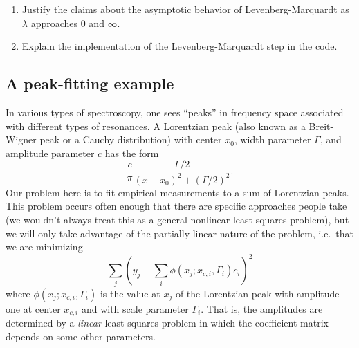 \documentclass[12pt, leqno]{article} %
\providecommand{\tightlist}{%
  \setlength{\itemsep}{0pt}\setlength{\parskip}{0pt}}
\begin{document}
\begin{enumerate}
\def\labelenumi{\arabic{enumi}.}
\tightlist
\item
  Justify the claims about the asymptotic behavior of
  Levenberg-Marquardt as \(\lambda\) approaches 0 and \(\infty\).
\item
  Explain the implementation of the Levenberg-Marquardt step in the
  code.
\end{enumerate}

\subsection{A peak-fitting example}

In various types of spectroscopy, one sees ``peaks'' in frequency space
associated with different types of resonances. A
\href{https://en.wikipedia.org/wiki/Cauchy_distribution}{Lorentzian}
peak (also known as a Breit-Wigner peak or a Cauchy distribution) with
center \(x_0\), width parameter \(\Gamma\), and amplitude parameter
\(c\) has the form
\[\frac{c}{\pi} \frac{\Gamma/2}{(x-x_0)^2 + (\Gamma/2)^2}.\] Our problem
here is to fit empirical measurements to a sum of Lorentzian peaks. This
problem occurs often enough that there are specific approaches people
take (we wouldn't always treat this as a general nonlinear least squares
problem), but we will only take advantage of the partially linear nature
of the problem, i.e.~that we are minimizing
\[\sum_j \left( y_j - \sum_i \phi(x_j; x_{c,i}, \Gamma_i) c_i \right)^2\]
where \(\phi(x_j; x_{c,i}, \Gamma_i)\) is the value at \(x_j\) of the
Lorentzian peak with amplitude one at center \(x_{c,i}\) and with scale
parameter \(\Gamma_i\). That is, the amplitudes are determined by a
\emph{linear} least squares problem in which the coefficient matrix
depends on some other parameters.
\end{document}
